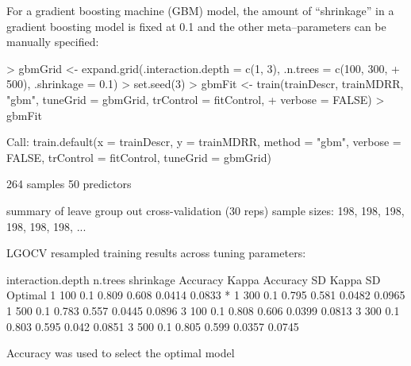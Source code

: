 \documentclass[12pt]{article}
\begin{document}
For a gradient boosting machine (GBM) model, the amount of ``shrinkage'' in a gradient boosting model is fixed at 0.1 and the other meta--parameters can be manually specified:
\begin{small}
\begin{landscape}

\begin{Schunk}
\begin{Sinput}
> gbmGrid <- expand.grid(.interaction.depth = c(1, 3), .n.trees = c(100, 300, 
+     500), .shrinkage = 0.1)
> set.seed(3)
> gbmFit <- train(trainDescr, trainMDRR, "gbm", tuneGrid = gbmGrid, trControl = fitControl, 
+     verbose = FALSE)
> gbmFit
\end{Sinput}
\begin{Soutput}
Call:
train.default(x = trainDescr, y = trainMDRR, method = "gbm", 
    verbose = FALSE, trControl = fitControl, tuneGrid = gbmGrid)

264 samples
50 predictors

summary of leave group out cross-validation (30 reps) sample sizes:
    198, 198, 198, 198, 198, 198, ... 

LGOCV resampled training results across tuning parameters:

  interaction.depth  n.trees  shrinkage  Accuracy  Kappa  Accuracy SD  Kappa SD  Optimal
  1                  100      0.1        0.809     0.608  0.0414       0.0833    *      
  1                  300      0.1        0.795     0.581  0.0482       0.0965           
  1                  500      0.1        0.783     0.557  0.0445       0.0896           
  3                  100      0.1        0.808     0.606  0.0399       0.0813           
  3                  300      0.1        0.803     0.595  0.042        0.0851           
  3                  500      0.1        0.805     0.599  0.0357       0.0745           

Accuracy was used to select the optimal model
\end{Soutput}
\end{Schunk}

\end{landscape}
\end{small}
\end{document}
